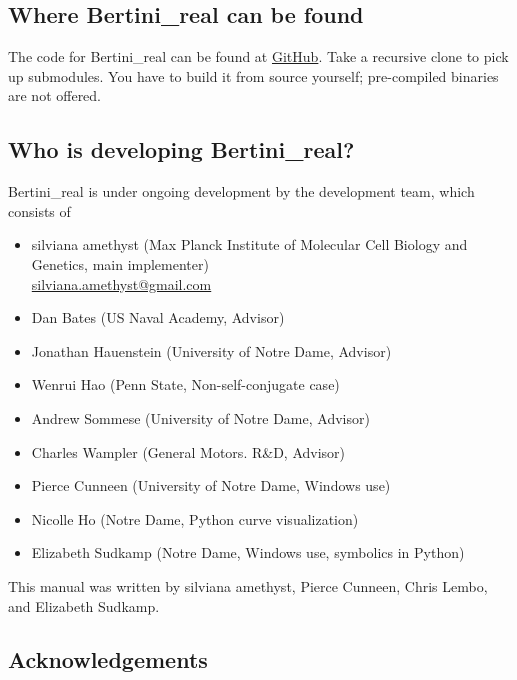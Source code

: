 \subsection{Where Bertini\_real can be found}
		
	The code for Bertini\_real can be found at \href{https://github.com/ofloveandhate/bertini_real}{GitHub}.  Take a recursive clone to pick up submodules.  You have to build it from source yourself; pre-compiled binaries are not offered. 


	\subsection{Who is developing Bertini\_real?}

	Bertini\_real is under ongoing development by the development team, which consists of 

	\begin{itemize}
		\item silviana amethyst (Max Planck Institute of Molecular Cell Biology and Genetics, main implementer)  \\ \href{mailto:silviana.amethyst@gmail.com}{silviana.amethyst@gmail.com} 
		\item Dan Bates (US Naval Academy, Advisor)
		\item Jonathan Hauenstein (University of Notre Dame, Advisor)
		\item Wenrui Hao (Penn State, Non-self-conjugate case)
		\item Andrew Sommese (University of Notre Dame, Advisor)
		\item Charles Wampler (General Motors. R\&D, Advisor)
		\item Pierce Cunneen (University of Notre Dame, Windows use) 
		\item Nicolle Ho (Notre Dame, Python curve visualization)
		\item Elizabeth Sudkamp (Notre Dame, Windows use, symbolics in Python)
	\end{itemize}
	This manual was written by silviana amethyst, Pierce Cunneen, Chris Lembo, and Elizabeth Sudkamp.



\subsection{Acknowledgements}

